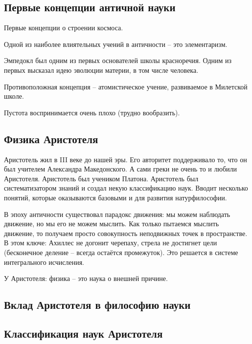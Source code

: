 \documentclass[main.tex]{subfiles}
\begin{document}

\subsection{Первые концепции античной науки}


Первые концепции о строении космоса.

Одной из наиболее влиятельных учений в античности -- это элементаризм.

Эмпедокл был одним из первых основателей школы красноречия.
Одним из первых высказал идею эволюции материи, в том числе человека.

Противоположная концепция -- атомистическое учение, развиваемое в Милетской школе.

Пустота воспринимается очень плохо (трудно вообразить).

\subsection{Физика Аристотеля}


Аристотель жил в III веке до нашей эры.
Его авторитет поддерживало то, что он был учителем Александра Македонского.
А сами греки не очень то и любили Аристотеля.
Аристотель был учеником Платона.
Аристотель был систематизатором знаний и создал некую классификацию наук.
Вводит несколько понятий, которые оказываются базовыми и для развития натурфилософии.

В эпоху античности существовал парадокс движения: мы можем наблюдать движение, но мы его не можем мыслить.
Как только пытаемся мыслить движение, то получаем просто совокупность неподвижных точек в пространстве.
В этом ключе: Ахиллес не догонит черепаху, стрела не достигнет цели (бесконечное деление -- всегда остаётся промежуток).
Это решается в системе интегрального исчисления.

У Аристотеля: физика -- это наука о внешней причине.

\subsection{Вклад Аристотеля в философию науки}


\subsection{Классификация наук Аристотеля}
\end{document}
